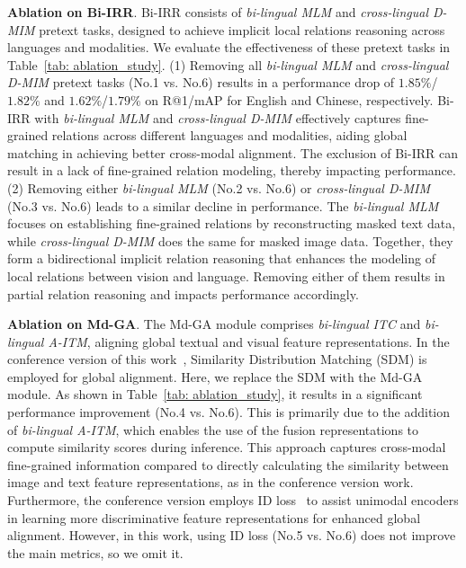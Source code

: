 \documentclass[10pt,journal,compsoc]{IEEEtran}
\begin{document}
\textbf{Ablation on Bi-IRR}. 
Bi-IRR consists of \emph{bi-lingual MLM} and \emph{cross-lingual D-MIM} pretext tasks, designed to achieve implicit local relations reasoning across languages and modalities.
We evaluate the effectiveness of these pretext tasks in Table~\ref{tab: ablation_study}.
(1) Removing all \emph{bi-lingual MLM} and \emph{cross-lingual D-MIM} pretext tasks (No.1 vs. No.6) results in a performance drop of \(1.85\%\)/\(1.82\%\) and \(1.62\%\)/\(1.79\%\) on R@1/mAP for English and Chinese, respectively.
Bi-IRR with \emph{bi-lingual MLM} and \emph{cross-lingual D-MIM} effectively captures fine-grained relations across different languages and modalities, aiding global matching in achieving better cross-modal alignment.
The exclusion of Bi-IRR can result in a lack of fine-grained relation modeling, thereby impacting performance.
(2) Removing either \emph{bi-lingual MLM} (No.2 vs. No.6) or \emph{cross-lingual D-MIM} (No.3 vs. No.6) leads to a similar decline in performance. 
The \emph{bi-lingual MLM} focuses on establishing fine-grained relations by reconstructing masked text data, while \emph{cross-lingual D-MIM} does the same for masked image data. 
Together, they form a bidirectional implicit relation reasoning that enhances the modeling of local relations between vision and language. 
Removing either of them results in partial relation reasoning and impacts performance accordingly.

\textbf{Ablation on Md-GA}. 
The Md-GA module comprises \emph{bi-lingual ITC} and \emph{bi-lingual A-ITM}, aligning global textual and visual feature representations. 
In the conference version of this work~\cite{jiang2023cross}, Similarity Distribution Matching (SDM) is employed for global alignment. Here, we replace the SDM with the Md-GA module. As shown in Table~\ref{tab: ablation_study}, it results in a significant performance improvement (No.4 vs. No.6). 
This is primarily due to the addition of \emph{bi-lingual A-ITM}, which enables the use of the fusion representations to compute similarity scores during inference. This approach captures cross-modal fine-grained information compared to directly calculating the similarity between image and text feature representations, as in the conference version work. 
Furthermore, the conference version employs ID loss~\cite{zheng2020dual} to assist unimodal encoders in learning more discriminative feature representations for enhanced global alignment. However, in this work, using ID loss (No.5 vs. No.6) does not improve the main metrics, so we omit it.
\end{document}
